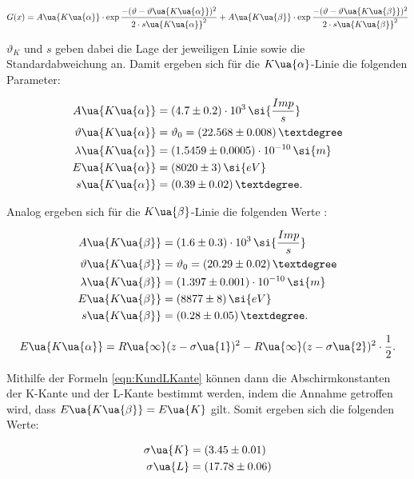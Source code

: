 \begin{equation}
  G(x) = A\ua{K\ua{\alpha}} \cdot \exp{ \frac{-(\vartheta-\vartheta\ua{K\ua{\alpha}})^2}{2\cdot s\ua{K\ua{\alpha}}^2}}
      + A\ua{K\ua{\beta}} \cdot \exp{ \frac{-(\vartheta-\vartheta\ua{K\ua{\beta}})^2}{2\cdot s\ua{K\ua{\beta}}^2}}
  \label{eqn:GaußFit}
\end{equation}

$\vartheta_K$ und $s$ geben dabei die Lage der jeweiligen Linie sowie die
Standardabweichung an. Damit ergeben sich für die $K\ua{\alpha}$-Linie die folgenden
Parameter:

\begin{align*}
  A\ua{K\ua{\alpha}} &= (4.7 \pm 0.2) \cdot 10^3 \, \si{\frac{Imp}{s}} \\
  \vartheta\ua{K\ua{\alpha}} &= \vartheta_0 =  (22.568 \pm 0.008) \,° \\
  \lambda\ua{K\ua{\alpha}} &= (1.5459 \pm 0.0005) \cdot 10^{-10} \, \si{m} \\
  E\ua{K\ua{\alpha}} &= (8020 \pm 3) \, \si{eV} \\
  s\ua{K\ua{\alpha}} &= (0.39 \pm 0.02) \,° .
\end{align*}

Analog ergeben sich für die $K\ua{\beta}$-Linie die folgenden Werte :

\begin{align*}
  A\ua{K\ua{\beta}} &= (1.6 \pm 0.3) \cdot 10^3 \, \si{\frac{Imp}{s}} \\
  \vartheta\ua{K\ua{\beta}} &= \vartheta_0 =  (20.29 \pm 0.02)\, ° \\
  \lambda\ua{K\ua{\beta}} &= (1.397 \pm 0.001) \cdot 10^{-10} \, \si{m} \\
  E\ua{K\ua{\beta}} &= (8877 \pm 8) \, \si{eV} \\
  s\ua{K\ua{\beta}} &= (0.28 \pm 0.05) \,° .
\end{align*}

\begin{equation}
  E\ua{K\ua{\alpha}} = R\ua{\infty} (z - \sigma\ua{1})^2 - R\ua{\infty} (z - \sigma\ua{2})^2 \cdot \frac{1}{2}.
  \label{eqn:KundLKante}
\end{equation}

Mithilfe der Formeln \ref{eqn:KundLKante} können dann die Abschirmkonstanten der K-Kante
und der L-Kante bestimmt werden, indem die Annahme getroffen wird, dass
$E\ua{K\ua{\beta}} = E\ua{K}$ gilt. Somit ergeben sich die folgenden Werte:

\begin{align*}
\sigma\ua{K} &= (3.45 \pm 0.01) \\
\sigma\ua{L} &= (17.78 \pm 0.06)
\end{align*}

